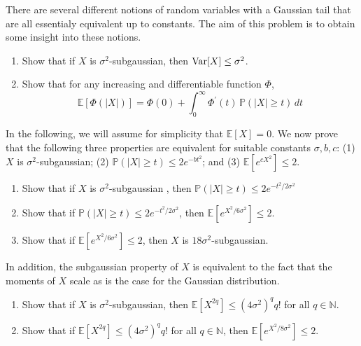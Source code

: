   \begin{exercise}
  There are several different notions of random variables with a Gaussian tail that are all essentialy equivalent up to constants. The aim of this problem is to obtain some insight into these notions. 
  \begin{enumerate}
      \item Show that if $X$ is $\sigma^2$-subgaussian, then $\Var[X] \leq \sigma^2$. 
      \item Show that for any increasing and differentiable function $\Phi$, 
      \[\mathbb{E}[ \Phi(|X|)] = \Phi(0) + \int_0^\infty \Phi^\prime (t) \, \mathbb{P}(|X| \geq t) \, dt\]
  \end{enumerate}
  In the following, we will assume for simplicity that $\mathbb{E}[X] = 0$. We now prove that the following three properties are equivalent for suitable constants $\sigma, b, c$: (1) $X$ is $\sigma^2$-subgaussian; (2) $\mathbb{P}(|X| \geq t) \leq 2 e^{-b t^2}$; and (3) $\mathbb{E}[e^{c X^2}] \leq 2$. 
  \begin{enumerate}[resume]
      \item Show that if $X$ is $\sigma^2$-subgaussian , then $\mathbb{P}(|X| \geq t) \leq 2 e^{-t^2 / 2 \sigma^2}$ 
      \item Show that if $\mathbb{P}(|X| \geq t) \leq 2 e^{- t^2 / 2 \sigma^2}$, then $\mathbb{E}[e^{X^2 / 6 \sigma^2} ] \leq 2$. 
      \item Show that if $\mathbb{E}[e^{X^2 / 6 \sigma^2}] \leq 2$, then $X$ is $18 \sigma^2$-subgaussian. 
  \end{enumerate}
  In addition, the subgaussian property of $X$ is equivalent to the fact that the moments of $X$ scale as is the case for the Gaussian distribution. 
  \begin{enumerate}[resume]
      \item Show that if $X$ is $\sigma^2$-subgaussian, then $\mathbb{E}[X^{2q}] \leq (4 \sigma^2)^q q!$ for all $q \in \mathbb{N}$. 
      \item Show that if $\mathbb{E}[X^{2q}] \leq (4 \sigma^2)^q q!$ for all $q \in \mathbb{N}$, then $\mathbb{E}[e^{X^2 / 8 \sigma^2}] \leq 2$. 
  \end{enumerate}
  \end{exercise}

